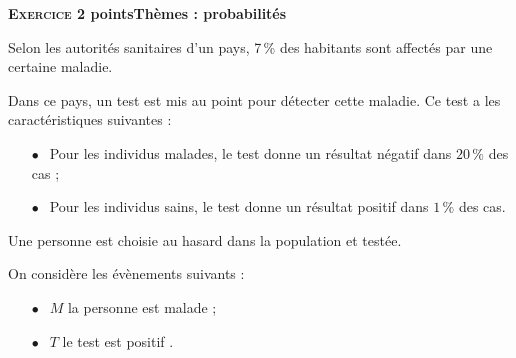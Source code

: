 \documentclass[11pt]{article}
\begin{document}
\bigskip

\textbf{\textsc{Exercice 2}   points\hfill Thèmes : probabilités}

\medskip


Selon les autorités sanitaires d'un pays, 7\,\% des habitants sont affectés par une certaine maladie.

Dans ce pays, un test est mis au point pour détecter cette maladie. Ce test a les caractéristiques suivantes :
\setlength\parindent{1cm}
\begin{itemize}
\item[$\bullet~~$] Pour les individus malades, le test donne un résultat négatif dans $20 \,\%$ des cas ;
\item[$\bullet~~$] Pour les individus sains, le test donne un résultat positif dans $1\,\%$ des cas.
\end{itemize}
\setlength\parindent{0cm}

Une personne est choisie au hasard dans la population et testée.

On considère les évènements suivants :

\setlength\parindent{1cm}
\begin{itemize}
\item[$\bullet~~$] $M$ \og la personne est malade \fg{} ;
\item[$\bullet~~$]  $T$ \og le test est positif \fg{}.
\end{itemize}
\setlength\parindent{0cm}

\medskip
\end{document}
